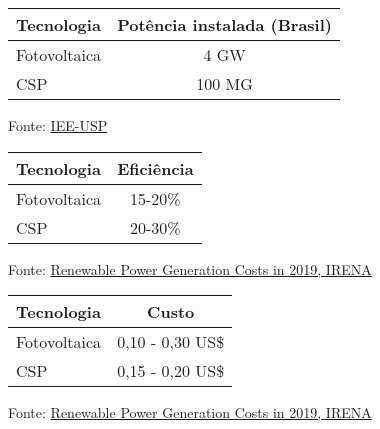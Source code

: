 \documentclass[12pt,notheorems,hyperref={pdfauthor=Professor Rafael Nardi}]{beamer}
\begin{document}
\begin{frame}

	\begin{table}
		\begin{tabular}{|lc|}
			\hline
			\rowcolor{primary}\color{white}Tecnologia & \color{white}Potência instalada (Brasil) \\
			\hline
			Fotovoltaica & 4 GW  \\
			CSP &  100 MG  \\
			\hline
		\end{tabular}		
	\end{table}
	
	\bigskip
	\bigskip
	\bigskip

	Fonte: \href{https://www.iee.usp.br/}{IEE-USP} 
\end{frame}

\begin{frame}

	\begin{table} 
		\begin{tabular}{|lc|}
			\hline
			\rowcolor{primary} \color{white}Tecnologia & \color{white}Eficiência  \\
			\hline
			Fotovoltaica & 15-20\% \\
			CSP & 20-30\% \\
			\hline
		\end{tabular}
	\end{table}
	
	\bigskip
	\bigskip
	\bigskip

	Fonte: \href{https://www.irena.org/reports/2019/Apr/Renewable-Power-Generation-Costs-in-2019}{Renewable
	Power Generation Costs in 2019, IRENA} 
\end{frame}

\begin{frame}

	\begin{table}
		\begin{tabular}{|lc|}
			\hline
			\rowcolor{primary} \color{white}Tecnologia & \color{white}Custo \\
			\hline
			Fotovoltaica & 0,10 - 0,30 US\$ \\
			CSP & 0,15 - 0,20 US\$ \\
			\hline
		\end{tabular}
	\end{table}
	
	\bigskip
	\bigskip
	\bigskip

	Fonte: \href{https://www.irena.org/reports/2019/Apr/Renewable-Power-Generation-Costs-in-2019}{Renewable
	Power Generation Costs in 2019, IRENA} 
\end{frame}
\end{document}
